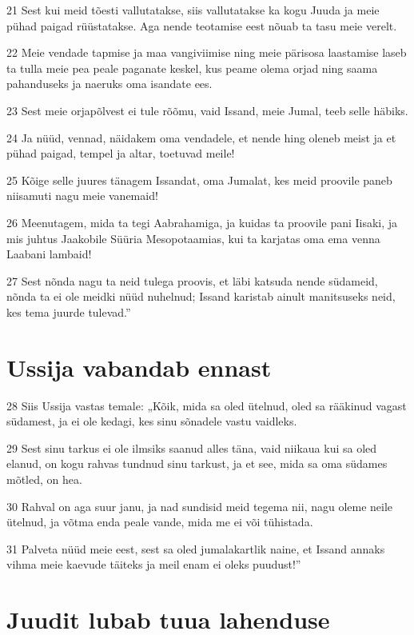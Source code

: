\par 21 Sest kui meid tõesti vallutatakse, siis vallutatakse ka kogu Juuda ja meie pühad paigad rüüstatakse. Aga nende teotamise eest nõuab ta tasu meie verelt.
\par 22 Meie vendade tapmise ja maa vangiviimise ning meie pärisosa laastamise laseb ta tulla meie pea peale paganate keskel, kus peame olema orjad ning saama pahanduseks ja naeruks oma isandate ees.
\par 23 Sest meie orjapõlvest ei tule rõõmu, vaid Issand, meie Jumal, teeb selle häbiks.
\par 24 Ja nüüd, vennad, näidakem oma vendadele, et nende hing oleneb meist ja et pühad paigad, tempel ja altar, toetuvad meile!
\par 25 Kõige selle juures tänagem Issandat, oma Jumalat, kes meid proovile paneb niisamuti nagu meie vanemaid!
\par 26 Meenutagem, mida ta tegi Aabrahamiga, ja kuidas ta proovile pani Iisaki, ja mis juhtus Jaakobile Süüria Mesopotaamias, kui ta karjatas oma ema venna Laabani lambaid!
\par 27 Sest nõnda nagu ta neid tulega proovis, et läbi katsuda nende südameid, nõnda ta ei ole meidki nüüd nuhelnud; Issand karistab ainult manitsuseks neid, kes tema juurde tulevad.”

\section*{Ussija vabandab ennast}

\par 28 Siis Ussija vastas temale: „Kõik, mida sa oled ütelnud, oled sa rääkinud vagast südamest, ja ei ole kedagi, kes sinu sõnadele vastu vaidleks.
\par 29 Sest sinu tarkus ei ole ilmsiks saanud alles täna, vaid niikaua kui sa oled elanud, on kogu rahvas tundnud sinu tarkust, ja et see, mida sa oma südames mõtled, on hea.
\par 30 Rahval on aga suur janu, ja nad sundisid meid tegema nii, nagu oleme neile ütelnud, ja võtma enda peale vande, mida me ei või tühistada.
\par 31 Palveta nüüd meie eest, sest sa oled jumalakartlik naine, et Issand annaks vihma meie kaevude täiteks ja meil enam ei oleks puudust!”

\section*{Juudit lubab tuua lahenduse}

